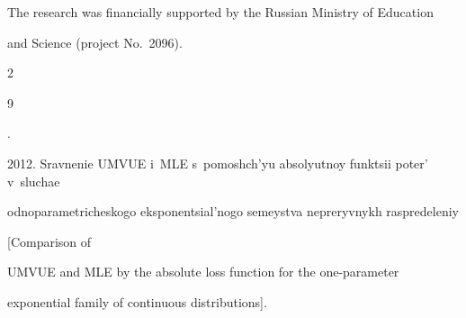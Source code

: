 \Ack


 \noindent


 The research was financially supported by the Russian Ministry of Education


 and Science (project No.~2096).








\vspace*{3pt}





  \begin{multicols}{2}





\renewcommand{\bibname}{\protect\rmfamily References}







{\small\frenchspacing


 {%




 \begin{thebibliography}{9}


 


 \vspace*{-9pt}


 




. 


2012. Sravnenie UMVUE i~MLE s~pomoshch'yu absolyutnoy funktsii po\-ter' v~sluchae 


odnoparametricheskogo eksponentsial'nogo semeystva nepreryvnykh raspredeleniy 


[Comparison of\linebreak\vspace*{-8pt}





\columnbreak





\noindent


 UMVUE and MLE by the absolute loss function for the one-parameter 


exponential family of continuous distributions]. 



\end{thebibliography}}}
\end{multicols}
